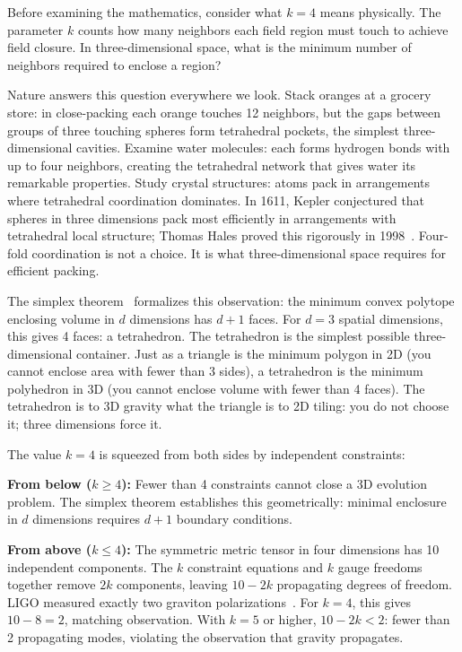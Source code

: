 \documentclass[aps,prd,preprint,superscriptaddress,showpacs,preprintnumbers,amsmath,amssymb,nofootinbib]{revtex4-2}
\begin{document}
Before examining the mathematics, consider what $k = 4$ means physically. The parameter $k$ counts how many neighbors each field region must touch to achieve field closure. In three-dimensional space, what is the minimum number of neighbors required to enclose a region?

Nature answers this question everywhere we look. Stack oranges at a grocery store: in close-packing each orange touches 12 neighbors, but the gaps between groups of three touching spheres form tetrahedral pockets, the simplest three-dimensional cavities. Examine water molecules: each forms hydrogen bonds with up to four neighbors, creating the tetrahedral network that gives water its remarkable properties. Study crystal structures: atoms pack in arrangements where tetrahedral coordination dominates. In 1611, Kepler conjectured that spheres in three dimensions pack most efficiently in arrangements with tetrahedral local structure; Thomas Hales proved this rigorously in 1998~\cite{hales2005}. Four-fold coordination is not a choice. It is what three-dimensional space requires for efficient packing.

The simplex theorem~\cite{ziegler1995} formalizes this observation: the minimum convex polytope enclosing volume in $d$ dimensions has $d+1$ faces. For $d = 3$ spatial dimensions, this gives 4 faces: a tetrahedron. The tetrahedron is the simplest possible three-dimensional container. Just as a triangle is the minimum polygon in 2D (you cannot enclose area with fewer than 3 sides), a tetrahedron is the minimum polyhedron in 3D (you cannot enclose volume with fewer than 4 faces). The tetrahedron is to 3D gravity what the triangle is to 2D tiling: you do not choose it; three dimensions force it.

The value $k = 4$ is squeezed from both sides by independent constraints:

\textbf{From below ($k \geq 4$):} Fewer than 4 constraints cannot close a 3D evolution problem. The simplex theorem establishes this geometrically: minimal enclosure in $d$ dimensions requires $d+1$ boundary conditions.

\textbf{From above ($k \leq 4$):} The symmetric metric tensor in four dimensions has 10 independent components. The $k$ constraint equations and $k$ gauge freedoms together remove $2k$ components, leaving $10 - 2k$ propagating degrees of freedom. LIGO measured exactly two graviton polarizations~\cite{gw170817}. For $k = 4$, this gives $10 - 8 = 2$, matching observation. With $k = 5$ or higher, $10 - 2k < 2$: fewer than 2 propagating modes, violating the observation that gravity propagates.
\end{document}
